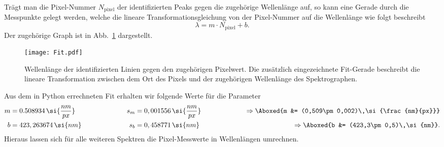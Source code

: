Trägt man die Pixel-Nummer $N_{\text{pixel}}$ der identifizierten Peaks 
gegen die zugehörige Wellenlänge auf, so kann eine Gerade durch die Messpunkte gelegt 
werden, welche die lineare Transformationsgleichung von der Pixel-Nummer auf 
die Wellenlänge wie folgt beschreibt
\begin{equation}
    \lambda = m\cdot N_{\text{pixel}} + b. 
\end{equation} \newpage
Der zugehörige Graph ist in Abb.~\ref{fig:fit} dargestellt.
\begin{figure}[h!]
    \centering
    \texttt{[image: Fit.pdf]}
    \caption{\label{fig:fit}Wellenlänge der identifizierten Linien gegen den zugehörigen 
    Pixelwert. Die zusätzlich eingezeichnete Fit-Gerade beschreibt die lineare Transformation 
    zwischen dem Ort des Pixels und der zugehörigen Wellenlänge des Spektrographen.}
\end{figure}\FloatBarrier
Aus dem in Python errechneten Fit erhalten wir folgende Werte für die Parameter
\begin{alignat}{3}
    m &= 0.508934\,\si{\frac{nm}{px}}\hspace{2cm}& s_{m} &= 0,001556\,\si{\frac{nm}{px}}\hspace{2cm} &\Rightarrow \Aboxed{m &= (0,509\pm 0,002)\,\si{\frac{nm}{px}}} \label{eq:kali}\\
    b &= 423,263674\,\si{nm}\hspace{2cm}& s_{b} &= 0,458771\,\si{nm}\hspace{2cm} &\Rightarrow \Aboxed{b &= (423,3\pm 0,5)\,\si{nm}}.
\end{alignat}
Hieraus lassen sich für alle weiteren Spektren die Pixel-Messwerte in Wellenlängen umrechnen. \\

